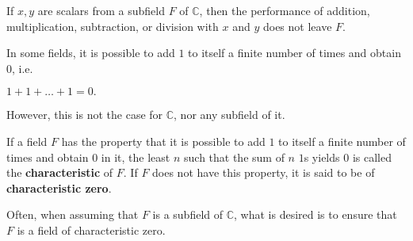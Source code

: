 \documentclass[12pt]{article}
\begin{document}
\begin{comm}
  If $x, y$ are scalars from a subfield $F$ of $\mathbb{C}$, then
  the performance of addition, multiplication, subtraction, or
  division with $x$ and $y$ does not leave $F$.
\end{comm}

\begin{comm}
  In some fields, it is possible to add $1$ to itself a finite
  number of times and obtain $0$, i.e.
  \begin{center}
    $1 + 1 + … + 1 = 0.$
  \end{center}
  However, this is not the case for $\mathbb{C}$, nor any
  subfield of it.
\end{comm}

\begin{defn}
  If a field $F$ has the property that it is possible to add $1$
  to itself a finite number of times and obtain $0$ in it, the
  least $n$ such that the sum of $n$ $1$s yields $0$ is called
  the \textbf{characteristic} of $F$. If $F$ does not have this
  property, it is said to be of \textbf{characteristic zero}.
\end{defn}

\begin{comm}
  Often, when assuming that $F$ is a subfield of $\mathbb{C}$,
  what is desired is to ensure that $F$ is a field of
  characteristic zero.
\end{comm}
\end{document}
